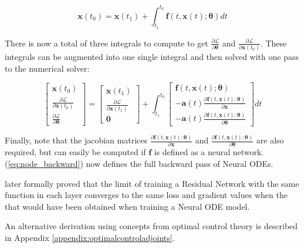 \documentclass[12pt,a4paper]{book}
\begin{document}
\begin{equation}
    \bm{x}(t_0) = \bm{x}(t_1) + \int_{t_1}^{t_0} \bm{f}(t, \bm{x}(t) ; \bm{\theta}) dt
\end{equation}

There is now a total of three integrals to compute to get $\frac{\partial \mathcal{L}}{\partial \bm{\theta}}$ and $\frac{\partial \mathcal{L}}{\partial \bm{x}(t_0)}$. These integrals can be augmented into one single integral and then solved with one pass to the numerical solver:

\begin{equation}
    \begin{bmatrix}
    \bm{x}(t_0) \\
    \frac{\partial \mathcal{L}}{\partial \bm{x}(t_0)} \\
    \frac{\partial \mathcal{L}}{\partial \bm{\theta}}
    \end{bmatrix} = \begin{bmatrix}
    \bm{x}(t_1) \\
    \frac{\partial \mathcal{L}}{\partial \bm{x}(t_1)} \\
    \bm{0}
    \end{bmatrix} + \int_{t_1}^{t_0} \begin{bmatrix}
    \bm{f}(t, \bm{x}(t) ; \bm{\theta}) \\
    - \bm{a}(t) \frac{\partial \bm{f}(t, \bm{x}(t) ; \bm{\theta})}{\partial \bm{x}} \\
    - \bm{a}(t) \frac{\partial \bm{f}(t, \bm{x}(t) ; \bm{\theta})}{\partial \bm{\theta}}
    \end{bmatrix} dt
    \label{eq:node_backward}
\end{equation}

Finally, note that the jacobian matrices $\frac{\partial \bm{f}(t, \bm{x}(t) ; \bm{\theta})}{\partial \bm{x}}$ and $\frac{\partial \bm{f}(t, \bm{x}(t) ; \bm{\theta})}{\partial \bm{\theta}}$ are also required, but can easily be computed if $\bm{f}$ is defined as a neural network. (\ref{eq:node_backward}) now defines the full backward pass of Neural ODEs.

\cite{resnetlimitnode} later formally proved that the limit of training a Residual Network with the same function in each layer converges to the same loss and gradient values when the that would have been obtained when training a Neural ODE model.

An alternative derivation using concepts from optimal control theory is described in Appendix \ref{appendix:optimalcontroladjoints}.
\end{document}

